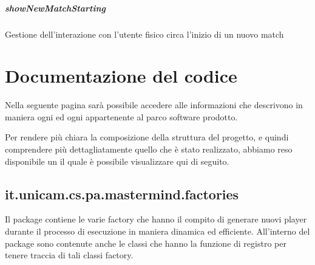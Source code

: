 \documentclass[letterpaper,10pt,italian,openany,oneside]{sphinxmanual}
\begin{document}
\paragraph{showNewMatchStarting}
\label{\detokenize{source/it/unicam/cs/pa/mastermind/ui/StartView:shownewmatchstarting}}

\begin{fulllineitems}
\label{\detokenize{source/it/unicam/cs/pa/mastermind/ui/StartView:it.unicam.cs.pa.mastermind.ui.StartView.showNewMatchStarting()}}
Gestione dell’interazione con l’utente fisico circa l’inizio di un nuovo match

\end{fulllineitems}



\chapter{Documentazione del codice}
\label{\detokenize{test/packages:documentazione-del-codice}}\label{\detokenize{test/packages::doc}}
Nella seguente pagina sarà possibile accedere alle informazioni che descrivono in maniera  ogni
 ed ogni  appartenente al parco software prodotto.

Per rendere più chiara la composizione della struttura del progetto, e quindi comprendere più dettagliatamente quello
che è stato realizzato, abbiamo reso disponibile un  il quale è possibile visualizzare qui di seguito.

\noindent{}


\section{it.unicam.cs.pa.mastermind.factories}
\label{\detokenize{test/it/unicam/cs/pa/mastermind/factories/package-index:it-unicam-cs-pa-mastermind-factories}}\label{\detokenize{test/it/unicam/cs/pa/mastermind/factories/package-index::doc}}
Il package contiene le varie factory che hanno il compito di generare nuovi player durante il processo di esecuzione in maniera dinamica ed efficiente. All’interno del package sono contenute anche le classi che hanno la funzione di registro per tenere traccia di tali classi factory.
\end{document}
